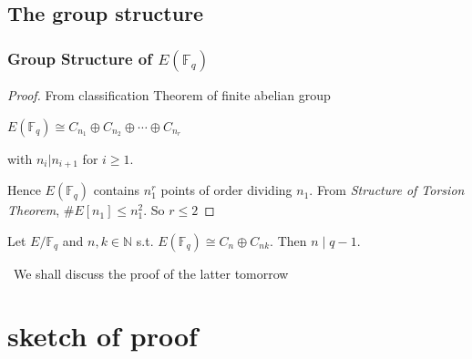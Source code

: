 \documentclass[10pt,handout]{beamer} %
\newcommand{\F}{\mathbb F}
\theoremstyle{definition}
\begin{document}
\subsection{The group structure}
\begin{frame}\frametitle{Group Structure of $E(\F_q)$}

\pause

\begin{proof}
From classification Theorem of finite abelian group\\
\centerline{$E(\F_q)\cong  C_{n_1}\oplus C_{n_2}\oplus\cdots\oplus C_{n_r}$}
with $n_i|n_{i+1}$ for $i\ge1$.\pause

Hence $E(\F_q)$ contains $n_1^r$ points of order dividing $n_1$. From
\emph{Structure of Torsion Theorem}, $\#E[n_1]\le n_1^2$.
So $r\le2$\end{proof}\pause

\begin{theorem}  Let $E/\F_q$ and $n,k\in\mathbb N$ s.t.
$E(\F_q)\cong C_n\oplus C_{nk}.$
Then $n\mid q-1$.
\end{theorem}\pause

\ \hfil We shall discuss the proof of the latter tomorrow
\end{frame}


\section{sketch of proof}
\end{document}
